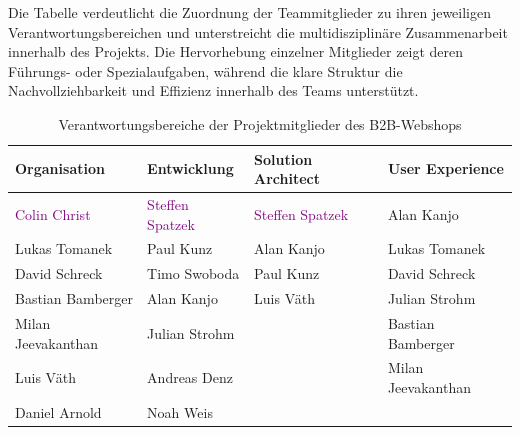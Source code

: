 \documentclass[%
	ngerman,
	12pt,
	a4paper,
	oneside,
	parskip=full
]{scrbook}
\begin{document}
Die Tabelle verdeutlicht die Zuordnung der Teammitglieder zu ihren jeweiligen Verantwortungsbereichen und unterstreicht die multidisziplinäre Zusammenarbeit innerhalb des Projekts.
Die Hervorhebung einzelner Mitglieder zeigt deren Führungs- oder Spezialaufgaben, während die klare Struktur die Nachvollziehbarkeit und Effizienz innerhalb des Teams unterstützt.
\begin{table}[ht]
	\centering
	\begin{tabular}{l|l|l|l}
		 \textbf{Organisation}   &    \textbf{Entwicklung}     & \textbf{Solution Architect} & \textbf{User Experience} \\ \hline
		\textcolor{purple}{Colin Christ} & \textcolor{purple}{Steffen Spatzek} & \textcolor{purple}{Steffen Spatzek} &        Alan Kanjo        \\ \hline
		     Lukas Tomanek       &          Paul Kunz          &         Alan Kanjo          &      Lukas Tomanek       \\ \hline
		     David Schreck       &        Timo Swoboda         &          Paul Kunz          &      David Schreck       \\ \hline
		   Bastian Bamberger     &         Alan Kanjo          &          Luis Väth          &      Julian Strohm       \\ \hline
		   Milan Jeevakanthan    &        Julian Strohm        &                             &    Bastian Bamberger     \\ \hline
		       Luis Väth         &        Andreas Denz         &                             &    Milan Jeevakanthan    \\ \hline
		     Daniel Arnold       &          Noah Weis          &                             &
	\end{tabular}
	\caption{Verantwortungsbereiche der Projektmitglieder des B2B-Webshops}
	\label{tab:teamstruktur}
\end{table}

\tableofcontents
\end{document}
